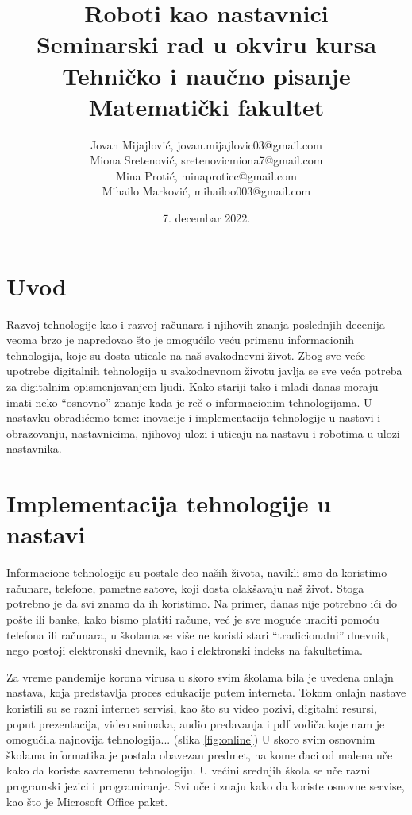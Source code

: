 \documentclass[a4paper]{article}
\title{Roboti kao nastavnici\small \\Seminarski rad u okviru kursa\\Tehničko i naučno pisanje\\Matematički fakultet}
\author{Jovan Mijajlović, jovan.mijajlovic03@gmail.com\\Miona Sretenović, sretenovicmiona7@gmail.com\\Mina Protić, minaproticc@gmail.com\\Mihailo Marković, mihailoo003@gmail.com}
\date{7. decembar 2022.}
\begin{document}
\maketitle


\tableofcontents
\newpage

\section{Uvod}
\label{sec:uvod}
Razvoj tehnologije kao i razvoj računara i njihovih znanja poslednjih decenija veoma brzo je napredovao što je omogućilo veću primenu informacionih tehnologija, koje su dosta uticale na naš svakodnevni život. Zbog sve veće upotrebe digitalnih tehnologija u svakodnevnom životu javlja se sve veća potreba za digitalnim opismenjavanjem ljudi. Kako stariji tako i mladi danas moraju imati neko “osnovno” znanje kada je reč o informacionim tehnologijama.
U nastavku obradićemo teme: inovacije i implementacija tehnologije u nastavi i obrazovanju, nastavnicima, njihovoj ulozi i uticaju na nastavu i robotima u ulozi nastavnika.

\section{Implementacija tehnologije u nastavi}
\label{sec:naslov1}

Informacione tehnologije su postale deo naših života, navikli smo da koristimo računare, telefone, pametne satove, koji dosta olakšavaju naš život. Stoga potrebno je da svi znamo da ih koristimo. Na primer, danas nije potrebno ići do pošte ili banke, kako bismo platiti račune, već je sve moguće uraditi pomoću telefona ili računara, u školama se više ne koristi stari “tradicionalni” dnevnik, nego postoji elektronski dnevnik, kao i elektronski indeks na fakultetima.

Za vreme pandemije korona virusa u skoro svim školama bila je uvedena onlajn nastava, koja predstavlja proces edukacije putem interneta. Tokom onlajn nastave koristili su se razni internet servisi, kao što su video pozivi, digitalni resursi, poput prezentacija, video snimaka, audio predavanja i pdf vodiča koje nam je omogućila najnovija tehnologija... (slika \ref{fig:online}) U skoro svim osnovnim školama informatika je postala obavezan predmet, na kome đaci od malena uče kako da koriste savremenu tehnologiju. U većini srednjih škola se uče razni programski jezici i programiranje. Svi uče i znaju kako da koriste osnovne servise, kao što je Microsoft Office paket.
\end{document}
